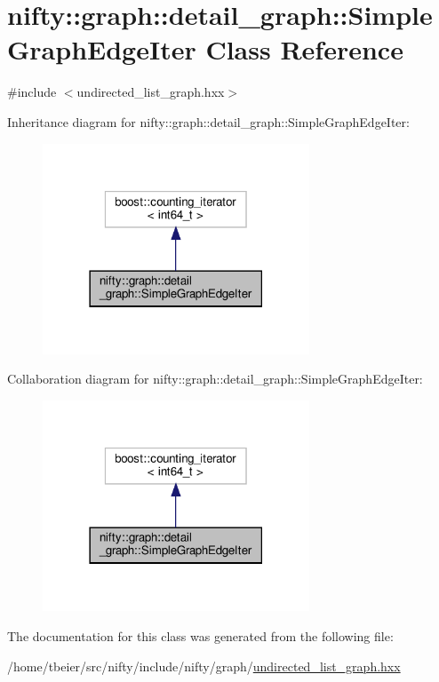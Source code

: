 \hypertarget{classnifty_1_1graph_1_1detail__graph_1_1SimpleGraphEdgeIter}{}\section{nifty\+:\+:graph\+:\+:detail\+\_\+graph\+:\+:Simple\+Graph\+Edge\+Iter Class Reference}
\label{classnifty_1_1graph_1_1detail__graph_1_1SimpleGraphEdgeIter}


{\ttfamily \#include $<$undirected\+\_\+list\+\_\+graph.\+hxx$>$}



Inheritance diagram for nifty\+:\+:graph\+:\+:detail\+\_\+graph\+:\+:Simple\+Graph\+Edge\+Iter\+:
\nopagebreak
\begin{figure}[H]
\begin{center}
\leavevmode
\includegraphics[width=225pt]{classnifty_1_1graph_1_1detail__graph_1_1SimpleGraphEdgeIter__inherit__graph}
\end{center}
\end{figure}


Collaboration diagram for nifty\+:\+:graph\+:\+:detail\+\_\+graph\+:\+:Simple\+Graph\+Edge\+Iter\+:
\nopagebreak
\begin{figure}[H]
\begin{center}
\leavevmode
\includegraphics[width=225pt]{classnifty_1_1graph_1_1detail__graph_1_1SimpleGraphEdgeIter__coll__graph}
\end{center}
\end{figure}


The documentation for this class was generated from the following file\+:\begin{DoxyCompactItemize}
\item 
/home/tbeier/src/nifty/include/nifty/graph/\hyperlink{graph_2undirected__list__graph_8hxx}{undirected\+\_\+list\+\_\+graph.\+hxx}\end{DoxyCompactItemize}
